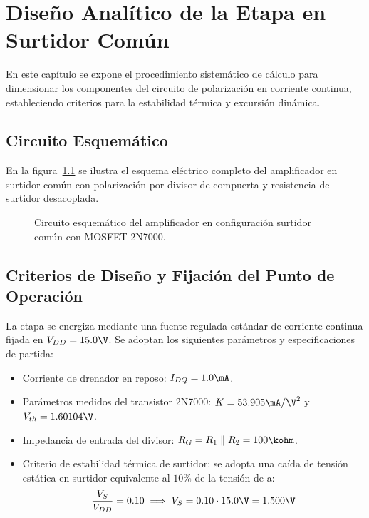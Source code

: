 \chapter{Diseño Analítico de la Etapa en Surtidor Común}
\label{chap:diseno_teorico}

En este capítulo se expone el procedimiento sistemático de cálculo para dimensionar los componentes del circuito de
polarización en corriente continua, estableciendo criterios para la estabilidad térmica y excursión dinámica.

\section{Circuito Esquemático}

En la figura~\ref{crkt:surtidor_comun} se ilustra el esquema eléctrico completo del amplificador en surtidor común con
polarización por divisor de compuerta y resistencia de surtidor desacoplada.

\begin{figure}[!ht]
  \centering
  
  \caption{Circuito esquemático del amplificador en configuración surtidor común con MOSFET 2N7000.}
  \label{crkt:surtidor_comun}
\end{figure}

\section{Criterios de Diseño y Fijación del Punto de Operación}

La etapa se energiza mediante una fuente regulada estándar de corriente continua fijada en $V_{DD} = 15.0\V$. Se adoptan
los siguientes parámetros y especificaciones de partida:
\begin{itemize}
  \item Corriente de drenador en reposo: $I_{DQ} = 1.0\mA$.
  \item Parámetros medidos del transistor 2N7000: $K = 53.905\mA/\V^2$ y $V_{th} = 1.60104\V$.
  \item Impedancia de entrada del divisor: $R_G = R_1 \parallel R_2 = 100\kohm$.
  \item Criterio de estabilidad térmica de surtidor: se adopta una caída de tensión estática en surtidor equivalente al
    $10\%$ de la tensión de a:
    \begin{equation}
      \frac{V_S}{V_{DD}} = 0.10 \implies V_S = 0.10 \cdot 15.0\V = 1.500\V
      \label{eq:criterio_VS}
    \end{equation}
\end{itemize}

